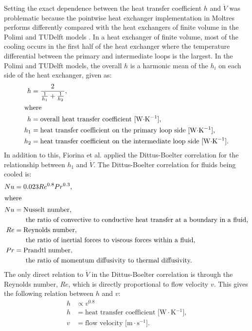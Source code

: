Setting the exact dependence between the heat transfer coefficient $h$ and
$\dot{V}$ was problematic because
the pointwise heat exchanger implementation in Moltres performs differently
compared with the heat exchangers of finite volume in the Polimi and TUDelft
models \cite{fiorina_modelling_2014}. In a heat exchanger of finite volume,
most of the cooling occurs in the first half of the heat exchanger where the
temperature differential between the primary and intermediate loops is the
largest. In the Polimi and TUDelft models, the overall $h$ is a
harmonic mean of the $h_i$ on each side of the heat exchanger, given as:
%
\begin{align}
    h &= \frac{2}{\frac{1}{h_1} + \frac{1}{h_2}}, \\
    \intertext{where}
    h &= \text{overall heat transfer coefficient
    [W$\cdot$K$^{-1}$],} \nonumber \\
    h_1 &= \text{heat transfer coefficient on the primary loop side
    [W$\cdot$K$^{-1}$],} \nonumber \\
    h_2 &= \text{heat transfer coefficient on the intermediate loop side
    [W$\cdot$K$^{-1}$].} \nonumber
\end{align}
%
In addition to this, Fiorina et al. applied the Dittus-Boelter correlation
\cite{dittus_heat_1930} for the relationship between $h_1$ and
$\dot{V}$. The Dittus-Boelter correlation for fluids being cooled is:
%
\begin{align}
    Nu &= 0.023 Re^{0.8} Pr^{0.3}, \label{eq:db} \\
    \intertext{where}
    Nu &= \text{Nusselt number,} \nonumber \\
    &\text{\ \ \ \ \ the ratio of convective to conductive heat
    transfer at a boundary in a fluid,} \nonumber \\
    Re &= \text{Reynolds number,} \nonumber \\
    &\text{\ \ \ \ \ the ratio of inertial forces to viscous
    forces within a fluid,} \nonumber \\
    Pr &= \text{Prandtl number,} \nonumber \\
    &\text{\ \ \ \ \ the ratio of momentum diffusivity to thermal
    diffusivity.} \nonumber
\end{align}
%
The only direct relation to $\dot{V}$ in the Dittus-Boelter correlation is
through the Reynolds number, $Re$, which is directly proportional to
flow velocity $v$. This gives the following relation between $h$ and $v$:
%
\begin{align}
    h &\propto v^{0.8} \label{eq:hv} \\
    h &= \text{heat transfer coefficient [W$\cdot$K$^{-1}$],} \nonumber \\
    v &= \text{flow velocity [m$\cdot$s$^{-1}$].} \nonumber
\end{align}
